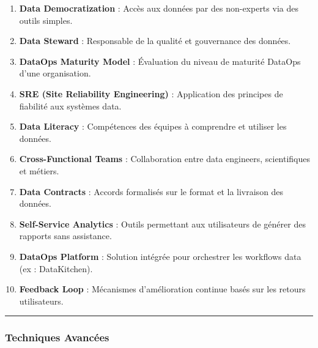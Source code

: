 \documentclass[
  letterpaper,
  DIV=11,
  numbers=noendperiod]{scrartcl}
\providecommand{\tightlist}{%
  \setlength{\itemsep}{0pt}\setlength{\parskip}{0pt}}\usepackage{longtable,booktabs,array}
\begin{document}
\begin{enumerate}
\def\labelenumi{\arabic{enumi}.}
\setcounter{enumi}{40}
\tightlist
\item
  \textbf{Data Democratization} : Accès aux données par des non-experts
  via des outils simples.\\
\item
  \textbf{Data Steward} : Responsable de la qualité et gouvernance des
  données.\\
\item
  \textbf{DataOps Maturity Model} : Évaluation du niveau de maturité
  DataOps d'une organisation.\\
\item
  \textbf{SRE (Site Reliability Engineering)} : Application des
  principes de fiabilité aux systèmes data.\\
\item
  \textbf{Data Literacy} : Compétences des équipes à comprendre et
  utiliser les données.\\
\item
  \textbf{Cross-Functional Teams} : Collaboration entre data engineers,
  scientifiques et métiers.\\
\item
  \textbf{Data Contracts} : Accords formalisés sur le format et la
  livraison des données.\\
\item
  \textbf{Self-Service Analytics} : Outils permettant aux utilisateurs
  de générer des rapports sans assistance.\\
\item
  \textbf{DataOps Platform} : Solution intégrée pour orchestrer les
  workflows data (ex : DataKitchen).\\
\item
  \textbf{Feedback Loop} : Mécanismes d'amélioration continue basés sur
  les retours utilisateurs.
\end{enumerate}

\begin{center}\rule{0.5\linewidth}{0.5pt}\end{center}

\subsubsection{\texorpdfstring{\textbf{Techniques
Avancées}}{Techniques Avancées}}\label{techniques-avancuxe9es}
\end{document}
